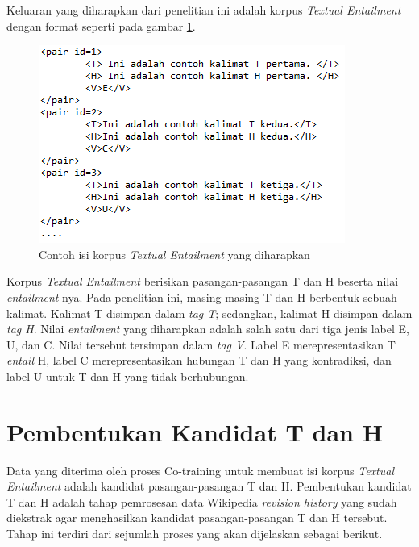 Keluaran yang diharapkan dari penelitian ini adalah korpus \textit{Textual Entailment} dengan format seperti pada gambar \ref{fig:isi-korpus}.
\begin{figure}
	\centering
	\includegraphics[width=0.67\linewidth]{pics/isi-korpus}
	\caption{Contoh isi korpus \textit{Textual Entailment} yang diharapkan}
	\label{fig:isi-korpus}
\end{figure}
\noindent Korpus \textit{Textual Entailment} berisikan pasangan-pasangan T dan H beserta nilai \textit{entailment}-nya. Pada penelitian ini, masing-masing T dan H berbentuk sebuah kalimat. Kalimat T disimpan dalam \textit{tag T}; sedangkan, kalimat H disimpan dalam \textit{tag H}. Nilai \textit{entailment} yang diharapkan adalah salah satu dari tiga jenis label E, U, dan C. Nilai tersebut tersimpan dalam \textit{tag V}. Label E merepresentasikan T \textit{entail} H, label C merepresentasikan hubungan T dan H yang kontradiksi, dan label U untuk T dan H yang tidak berhubungan.


\section{Pembentukan Kandidat T dan H} \label{sec:pembentukanTdanH}
Data yang diterima oleh proses Co-training untuk membuat isi korpus \textit{Textual Entailment} adalah kandidat pasangan-pasangan T dan H. Pembentukan kandidat T dan H adalah tahap pemrosesan data Wikipedia \textit{revision history} yang sudah diekstrak agar menghasilkan kandidat pasangan-pasangan T dan H tersebut. Tahap ini terdiri dari sejumlah proses yang akan dijelaskan sebagai berikut.

